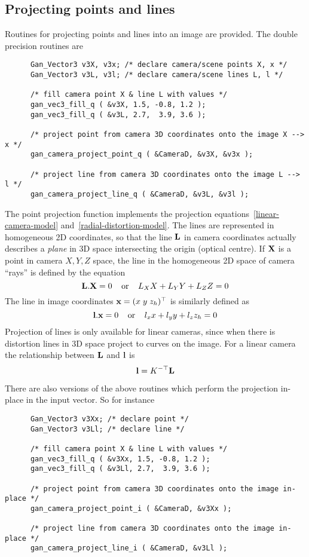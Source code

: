 \subsection{Projecting points and lines}
Routines for projecting points and lines into an image are provided.
The double precision routines are
\begin{verbatim}
      Gan_Vector3 v3X, v3x; /* declare camera/scene points X, x */
      Gan_Vector3 v3L, v3l; /* declare camera/scene lines L, l */

      /* fill camera point X & line L with values */
      gan_vec3_fill_q ( &v3X, 1.5, -0.8, 1.2 );
      gan_vec3_fill_q ( &v3L, 2.7,  3.9, 3.6 );

      /* project point from camera 3D coordinates onto the image X --> x */
      gan_camera_project_point_q ( &CameraD, &v3X, &v3x );

      /* project line from camera 3D coordinates onto the image L --> l */
      gan_camera_project_line_q ( &CameraD, &v3L, &v3l );
\end{verbatim}
The point projection function implements the projection
equations~\ref{linear-camera-model} and~\ref{radial-distortion-model}.
The lines are represented in homogeneous 2D coordinates, so that
the line ${\bf L}$ in camera coordinates actually describes a {\em plane}
in 3D space intersecting the origin (optical centre). If ${\bf X}$ is a
point in camera $X,Y,Z$ space, the line in the homogeneous 2D space of
camera ``rays'' is defined by the equation
\[ {\bf L}.{\bf X} = 0\;\;\;\;\mbox{or}\;\;\;\; L_X X + L_Y Y + L_Z Z = 0
\]
The line in image coordinates ${\bf x}=(x\;y\;z_h)^{\top}$ is similarly defined as
\[ {\bf l}.{\bf x} = 0\;\;\;\;\mbox{or}\;\;\;\; l_x x + l_y y + l_z z_h = 0
\]
Projection of lines is only available for linear cameras, since when there
is distortion lines in 3D space project to curves on the image.
For a linear camera the relationship between ${\bf L}$ and ${\bf l}$ is
\[ {\bf l} = K^{-\top}{\bf L}
\]

There are also versions of the above routines which perform the projection
in-place in the input vector. So for instance
\begin{verbatim}
      Gan_Vector3 v3Xx; /* declare point */
      Gan_Vector3 v3Ll; /* declare line */

      /* fill camera point X & line L with values */
      gan_vec3_fill_q ( &v3Xx, 1.5, -0.8, 1.2 );
      gan_vec3_fill_q ( &v3Ll, 2.7,  3.9, 3.6 );

      /* project point from camera 3D coordinates onto the image in-place */
      gan_camera_project_point_i ( &CameraD, &v3Xx );

      /* project line from camera 3D coordinates onto the image in-place */
      gan_camera_project_line_i ( &CameraD, &v3Ll );
\end{verbatim}


